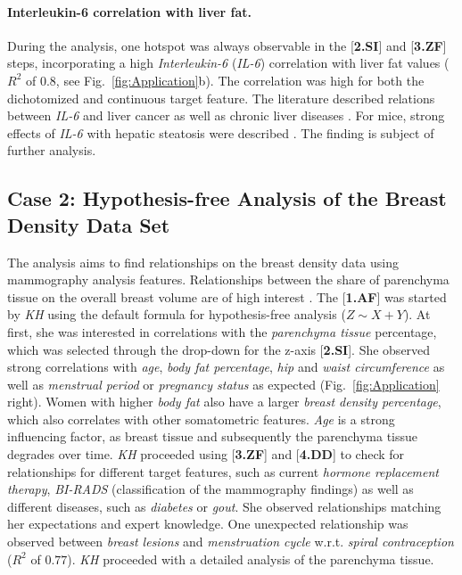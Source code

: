 \documentclass[journal]{style/vgtc} 			          %
\begin{document}
\paragraph{Interleukin-6 correlation with liver fat.}
During the analysis, one hotspot was always observable in the [\textbf{2.SI}] and [\textbf{3.ZF}] steps, incorporating a high \emph{Interleukin-6} (\emph{IL-6}) correlation with liver fat values ($R^2$ of $0.8$, see Fig.~\ref{fig:Application}b).
The correlation was high for both the dichotomized and continuous target feature.
The literature described relations between \emph{IL-6} and liver cancer \cite{He2013} as well as chronic liver diseases \cite{Streetz2003}.
For mice, strong effects of \emph{IL-6} with hepatic steatosis were described \cite{Hong2004}.
The finding is subject of further analysis.
\subsection{Case 2: Hypothesis-free Analysis of the Breast Density Data Set}
The analysis aims to find relationships on the breast density data using mammography analysis features.
Relationships between the share of parenchyma tissue on the overall breast volume are of high interest \cite{Mccormack2006}.
The [\textbf{1.AF}] was started by \emph{KH} using the default formula for hypothesis-free analysis ($Z \sim X + Y$).
At first, she was interested in correlations with the \emph{parenchyma tissue} percentage, which was selected through the drop-down for the z-axis [\textbf{2.SI}].
She observed strong correlations with \emph{age}, \emph{body fat percentage}, \emph{hip} and \emph{waist circumference} as well as \emph{menstrual period} or \emph{pregnancy status} as expected (Fig.~\ref{fig:Application} right).
Women with higher \emph{body fat} also have a larger \emph{breast density percentage}, which also correlates with other somatometric features.
\emph{Age} is a strong influencing factor, as breast tissue and subsequently the parenchyma tissue degrades over time.
\emph{KH} proceeded using [\textbf{3.ZF}] and [\textbf{4.DD}] to check for relationships for different target features, such as current \emph{hormone replacement therapy}, \emph{BI-RADS} (classification of the mammography findings) as well as different diseases, such as \emph{diabetes} or \emph{gout}.
She observed relationships matching her expectations and expert knowledge.
One unexpected relationship was observed between \emph{breast lesions} and \emph{menstruation cycle} w.r.t. \emph{spiral contraception} ($R^2$ of $0.77$).
\emph{KH} proceeded with a detailed analysis of the parenchyma tissue.
\end{document}
